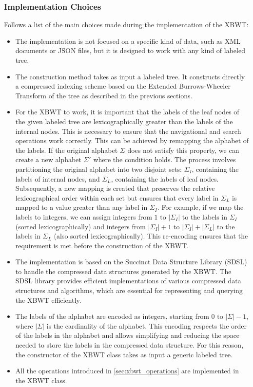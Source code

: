 \subsubsection{Implementation Choices}
Follows a list of the main choices made during the implementation of the XBWT:
\begin{itemize}
    \item The implementation is not focused on a specific kind of data, such as XML documents or JSON files, but it is designed to work with any kind of labeled tree. 
    \item The construction method takes as input a labeled tree. It constructs directly a compressed indexing scheme based on the Extended Burrows-Wheeler Transform of the tree as described in the previous sections.
    \item For the XBWT to work, it is important that the labels of the leaf nodes of the given labeled tree are lexicographically greater than the labels of the internal nodes. This is necessary to ensure that the navigational and search operations work correctly. This can be achieved by remapping the alphabet of the labels. If the original alphabet $\Sigma$ does not satisfy this property, we can create a new alphabet $\Sigma'$ where the condition holds. The process involves partitioning the original alphabet into two disjoint sets: $\Sigma_I$, containing the labels of internal nodes, and $\Sigma_L$, containing the labels of leaf nodes. Subsequently, a new mapping is created that preserves the relative lexicographical order within each set but ensures that every label in $\Sigma_L$ is mapped to a value greater than any label in $\Sigma_I$. For example, if we map the labels to integers, we can assign integers from $1$ to $|\Sigma_I|$ to the labels in $\Sigma_I$ (sorted lexicographically) and integers from $|\Sigma_I|+1$ to $|\Sigma_I|+|\Sigma_L|$ to the labels in $\Sigma_L$ (also sorted lexicographically). This re-encoding ensures that the requirement is met before the construction of the XBWT.
    \item The implementation is based on the Succinct Data Structure Library (SDSL) to handle the compressed data structures generated by the XBWT. The SDSL library provides efficient implementations of various compressed data structures and algorithms, which are essential for representing and querying the XBWT efficiently.
    \item The labels of the alphabet are encoded as integers, starting from 0 to $|\Sigma| - 1$, where $|\Sigma|$ is the cardinality of the alphabet. This encoding respects the order of the labels in the alphabet and allows simplifying and reducing the space needed to store the labels in the compressed data structure. For this reason, the constructor of the XBWT class takes as input a generic labeled tree.
    \item All the operations introduced in \cref{sec:xbwt_operations} are implemented in the XBWT class.
\end{itemize}

